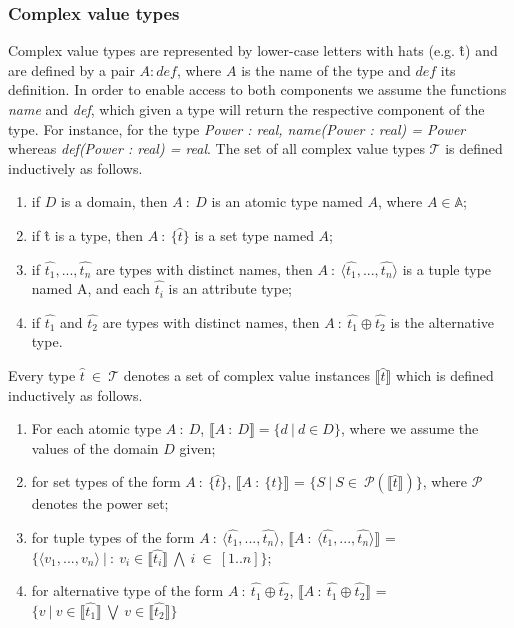 \subsubsection{Complex value types}
Complex value types are represented by lower-case letters with hats (e.g. \^{t}) and are defined by a pair $A : def$, where $A$ is the name of the type and $def$ its definition. In order to enable access to both components we assume the functions \textit{name} and \textit{def}, which given a type will return the respective component of the type. For instance, for the type \textit{Power : real, name(Power : real) = Power} whereas \textit{def(Power : real) = real}.
The set of all complex value types $\mathcal{T}$ is defined inductively as follows.
\begin{enumerate}
 \item if $D$ is a domain, then $A\ :\ D$ is an atomic type named $A$, where $A \in \mathbb{A}$;
 \item if \^{t} is a type, then $A\ :\ \{\hat{t}\}$ is a set type named $A$;
 \item if $\hat{t_1}, ..., \hat{t_n}$ are types with distinct names, then $A\ :\ \langle\hat{t_1}, ..., \hat{t_n}\rangle$ is a tuple type named A, and each $\hat{t_i}$ is an attribute type;
 \item if $\hat{t_1}$ and  $\hat{t_2}$ are types with distinct names, then $A\ :\ \hat{t_1} \oplus \hat{t_2}$ is the alternative type.  
\end{enumerate}
Every type $\hat{t} \ \in \ \mathcal{T} $  denotes a set of complex value instances $\llbracket \hat{t} \rrbracket$ which is defined inductively as follows.
\begin{enumerate}
 \item For each atomic type $A\ :\ D$, $\llbracket A\ :\ D\rrbracket = \{d\ |\ d \in D\}$, where we assume the values of the domain $D$ given;
 \item for set types of the form $A\ :\ \{\hat{t}\}$, $\llbracket A\ :\ \{\hat{t}\}\rrbracket$ = $\{S\ |\ S\in\  \mathcal{P}(\llbracket \hat{t}\rrbracket)\}$, where $\mathcal{P}$ denotes the power set;
 \item for tuple types of the form $A\ :\ \langle  \hat{t_1}, ..., \hat{t_n}\rangle$, $\llbracket A\ : \ \langle  \hat{t_1}, ..., \hat{t_n}\rangle \rrbracket$ = $\{\langle v_1, ..., v_n\rangle \ | \ :\ v_i \in \llbracket \hat{t_i}\rrbracket \ \bigwedge \ i \ \in \ [1..n]\}$;
 \item for alternative type of the form $A\ :\ \hat{t_1} \oplus \hat{t_2}$, $\llbracket A\ :\   \hat{t_1} \oplus \hat{t_2} \rrbracket$ = $\{v\ |\ v \in \llbracket \hat{t_1}\rrbracket\ \bigvee\ v \in \llbracket \hat{t_2}\rrbracket\}$
\end{enumerate}
